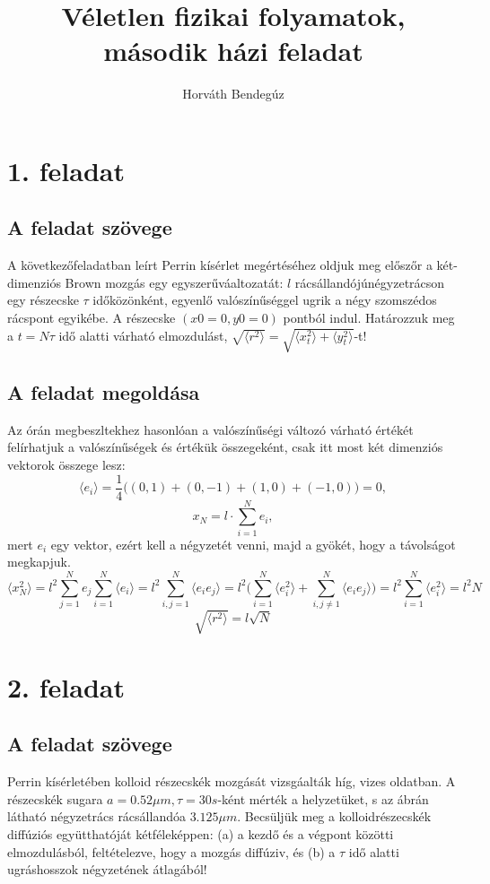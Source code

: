 \documentclass[12pt]{article}
\title{Véletlen fizikai folyamatok, második házi feladat}
\author{Horváth Bendegúz}
\begin{document}
\maketitle



\section*{1. feladat}

\subsection*{ A feladat szövege} A következőfeladatban leírt Perrin kísérlet megértéséhez oldjuk meg előszőr a két-dimenziós Brown mozgás
egy egyszerűváaltozatát: $l$ rácsállandójúnégyzetrácson egy részecske $\tau$ időközönként, egyenlő valószínűséggel ugrik a négy szomszédos rácspont egyikébe. A részecske $ (x0 = 0, y0 = 0)$ pontból indul.
Határozzuk meg a $t = N\tau $ idő alatti várható elmozdulást,  $\sqrt{\langle r^2 \rangle }= \sqrt{\langle x^2_t \rangle+ \langle y^2_t\rangle}$-t!

 
\subsection*{A feladat megoldása} Az órán megbeszltekhez hasonlóan a valószínűségi változó várható értékét felírhatjuk a valószínűségek és értékük összegeként, csak itt most két dimenziós vektorok összege lesz:
$$\langle e_i \rangle = \frac{1}{4}\big ( (0, 1)+(0,-1)+(1,0)+(-1,0)\big ) =0, $$
$$ x_N = l\cdot \sum_{i=1}^N e_i,$$
mert $e_i$ egy vektor, ezért kell a négyzetét venni, majd a gyökét, hogy a távolságot megkapjuk.
$$\langle x^2_N\rangle = l^2\sum_{j=1}^Ne_j\sum_{i=1}^N \langle e_i \rangle = l^2\sum_{i,j=1}^N \langle e_i e_j\rangle = l^2 \Big (\sum_{i=1}^N \langle e^2_i \rangle +\sum_{i,j \neq 1}^N\langle e_i e_j \rangle \Big ) = l^2 \sum_{i=1}^N \langle e^2_i \rangle = {l^2N}$$
$$\sqrt{\langle r^2 \rangle} = l\sqrt{N} $$
 
\newpage
\section*{2. feladat}

\subsection*{ A feladat szövege}
Perrin kísérletében kolloid részecskék mozgását vizsgáalták híg, vizes oldatban. A részecskék sugara
$a = 0.52\mu m, \tau = 30s$-ként mérték a helyzetüket, s az ábrán látható négyzetrács rácsállandóa $3.125\mu m$. Becsüljük meg a kolloidrészecskék diffúziós együtthatóját kétféleképpen: (a) a kezdő és a végpont közötti elmozdulásból, feltételezve, hogy a mozgás diffúziv, és (b) a $\tau$ idő alatti ugráshosszok négyzetének átlagából!
\end{document}

